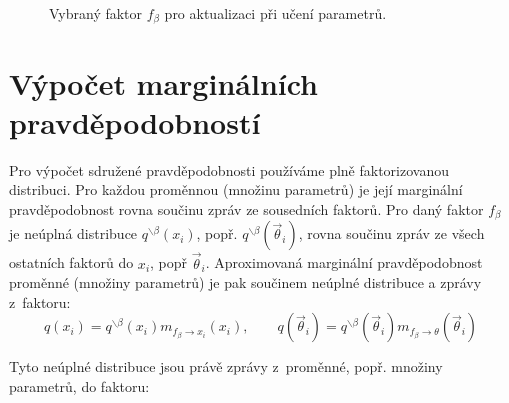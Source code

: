 \begin{figure}[h]
\begin{center}
\end{center}
\caption{Vybraný faktor $f_\beta$ pro aktualizaci při učení parametrů.}
\label{ex:factor}
\end{figure}

\section{Výpočet marginálních pravděpodobností}

Pro výpočet sdružené pravděpodobnosti používáme plně faktorizovanou distribuci.
Pro každou proměnnou (množinu parametrů) je její marginální pravděpodobnost
rovna součinu zpráv ze sousedních faktorů.
Pro daný faktor $f_\beta$ je neúplná distribuce $q^{\backslash \beta}(x_i)$, popř.
$q^{\backslash \beta}(\vec{\theta}_i)$, rovna součinu zpráv ze všech ostatních faktorů do $x_i$, popř $\vec\theta_i$.
Aproximovaná marginální pravděpodobnost proměnné (množiny parametrů) je pak součinem neúplné
distribuce a zprávy z~faktoru:
$$q(x_i) = q^{\backslash \beta}(x_i) m_{f_\beta \rightarrow x_i}(x_i), 
\quad \quad
q(\vec{\theta}_i) = q^{\backslash \beta}(\vec{\theta}_i) m_{f_\beta \rightarrow \theta}(\vec{\theta}_i)$$

Tyto neúplné distribuce jsou právě zprávy z~proměnné, popř. množiny parametrů, do faktoru:

